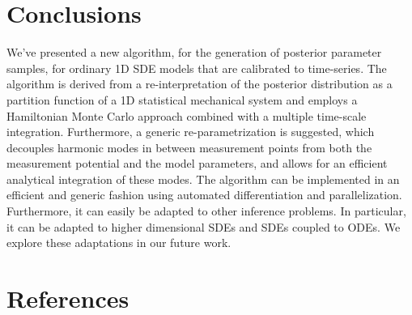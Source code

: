 \documentclass[12pt,a4paper,final]{iopart}
\begin{document}
\section{Conclusions}

We've presented a new algorithm, for the generation of posterior parameter samples, for ordinary 1D SDE models that are calibrated to time-series.
The algorithm is derived from a re-interpretation of the posterior distribution as a partition function of a 1D statistical mechanical system and employs a Hamiltonian Monte Carlo approach combined with a multiple time-scale integration.
Furthermore, a generic re-parametrization is suggested, which decouples harmonic modes in between measurement points from both the measurement potential and the model parameters, and allows for an efficient analytical integration of these modes. 
The algorithm can be implemented in an efficient and generic fashion using automated differentiation and parallelization.
Furthermore, it can easily be adapted to other inference problems.
In particular, it can be adapted to higher dimensional SDEs and SDEs coupled to ODEs.
We explore these adaptations in our future work.

\section*{References}



\end{document}
